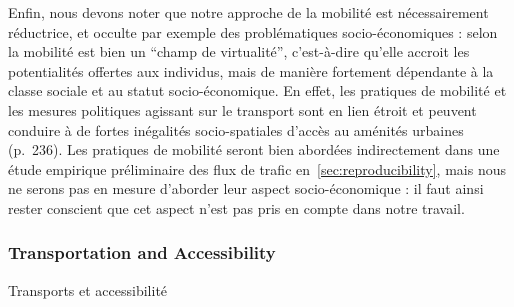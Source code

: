 

Enfin, nous devons noter que notre approche de la mobilité est nécessairement réductrice, et occulte par exemple des problématiques socio-économiques : selon \cite{remy2000metropolisation} la mobilité est bien un ``champ de virtualité'', c'est-à-dire qu'elle accroit les potentialités offertes aux individus, mais de manière fortement dépendante à la classe sociale et au statut socio-économique. En effet, les pratiques de mobilité et les mesures politiques agissant sur le transport sont en lien étroit et peuvent conduire à de fortes inégalités socio-spatiales d'accès au aménités urbaines \cite{gallez2015mobilite} (p.~236). Les pratiques de mobilité seront bien abordées indirectement dans une étude empirique préliminaire des flux de trafic en~\ref{sec:reproducibility}, mais nous ne serons pas en mesure d'aborder leur aspect socio-économique : il faut ainsi rester conscient que cet aspect n'est pas pris en compte dans notre travail.




\subsubsection{Transportation and Accessibility}{Transports et accessibilité}


